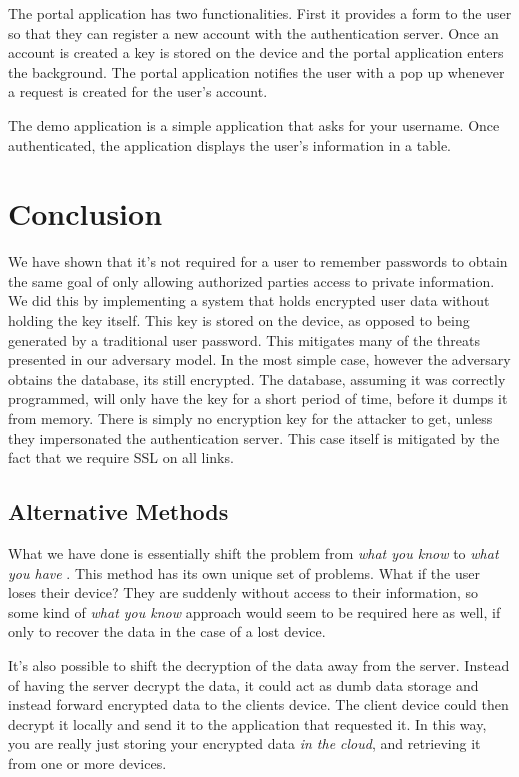 \documentclass[letterpaper,twocolumn,10pt]{article}
\begin{document}
The portal application has two functionalities. First it provides a form to the user so that they can register a new account with the authentication server. Once an account is created a key is stored on the device and the portal application enters the background. The portal application notifies the user with a pop up whenever a request is created for the user's account.

The demo application is a simple application that asks for your username. Once authenticated, the application displays the user's information in a table. 


\section{Conclusion}
    We have shown that it's not required for a user to remember passwords to obtain the same goal of only allowing authorized parties access to private information. We did this by implementing a system that holds encrypted user data without holding the key itself. This key is stored on the device, as opposed to being generated by a traditional user password. This mitigates many of the threats presented in our adversary model. In the most simple case, however the adversary obtains the database, its still encrypted. The database, assuming it was correctly programmed, will only have the key for a short period of time, before it dumps it from memory. There is simply no encryption key for the attacker to get, unless they impersonated the authentication server. This case itself is mitigated by the fact that we require SSL on all links.

\subsection{Alternative Methods}

What we have done is essentially shift the problem from \textit{what you know} to \textit{what you have} \cite[Chapter~9]{privcomm}. This method has its own unique set of problems. What if the user loses their device? They are suddenly without access to their information, so some kind of \textit{what you know} approach would seem to be required here as well, if only to recover the data in the case of a lost device.

It's also possible to shift the decryption of the data away from the server. Instead of having the server decrypt the data, it could act as dumb data storage and instead forward encrypted data to the clients device. The client device could then decrypt it locally and send it to the application that requested it. In this way, you are really just storing your encrypted data \textit{in the cloud}, and retrieving it from one or more devices. 



{
    \small
    
    
}
\end{document}
